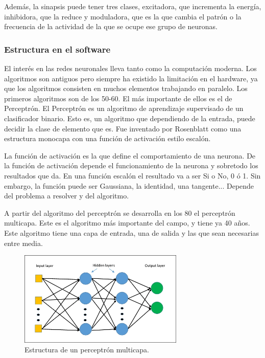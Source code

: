 \documentclass[12pt]{article}
\numberwithin{equation}{section}
\begin{document}
Además, la sinapsis puede tener tres clases, excitadora, que incrementa la energía, 	inhibidora, que la reduce y moduladora, que es la que cambia el patrón o la frecuencia de la actividad de la que se ocupe ese grupo de neuronas. 

\subsubsection{Estructura en el software}

El interés en las redes neuronales lleva tanto como la computación moderna. Los algoritmos son antiguos pero siempre ha existido la limitación en el hardware, ya que los algoritmos consisten en muchos elementos trabajando en paralelo. Los primeros algoritmos son de los 50-60. El más importante de ellos es el de Perceptrón. El Perceptrón es un algoritmo de aprendizaje supervisado de un clasificador binario. Esto es, un algoritmo que dependiendo de la entrada, puede decidir la clase de elemento que es. Fue inventado por Rosenblatt como una estructura monocapa con una función de activación estilo escalón.

La función de activación es la que define el comportamiento de una neurona. De la función de activación depende el funcionamiento de la neurona y sobretodo los resultados que da. En una función escalón el resultado va a ser Si o No, 0 ó 1. Sin embargo, la función puede ser Gaussiana, la identidad, una tangente... Depende del problema a resolver y del algoritmo.

A partir del algoritmo del perceptrón se desarrolla en los 80 el perceptrón multicapa. Este es el algoritmo más importante del campo, y tiene ya 40 años. Este algoritmo tiene una capa de entrada, una de salida y las que sean necesarias entre media.

\begin{figure}[h]
    \centering
    \includegraphics[width=0.7\textwidth]{multicapa.jpg}
    \caption{Estructura de un perceptrón multicapa.}
    \label{fig:estructuraneurona}
\end{figure}
\end{document}
